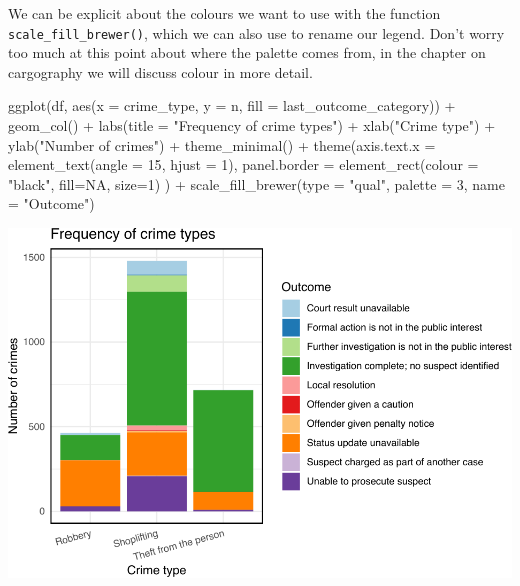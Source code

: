 \documentclass[
  krantz2]{krantz}
\makeatletter
\newenvironment{Shaded}{\begin{snugshade}}{\end{snugshade}}
\newcommand{\AttributeTok}[1]{\textcolor[rgb]{0.61,0.61,0.61}{#1}}
\newcommand{\ConstantTok}[1]{\textcolor[rgb]{0,0,0}{#1}}
\newcommand{\DecValTok}[1]{\textcolor[rgb]{0.06,0.06,0.06}{#1}}
\newcommand{\FunctionTok}[1]{\textcolor[rgb]{0,0,0}{#1}}
\newcommand{\NormalTok}[1]{#1}
\newcommand{\SpecialCharTok}[1]{\textcolor[rgb]{0,0,0}{#1}}
\newcommand{\StringTok}[1]{\textcolor[rgb]{0.5,0.5,0.5}{#1}}
\newenvironment{kframe}{%
\medskip{}
\setlength{\fboxsep}{.8em}
 \def\at@end@of@kframe{}%
 \ifinner\ifhmode%
  \def\at@end@of@kframe{\end{minipage}}%
  \begin{minipage}{\columnwidth}%
 \fi\fi%
 \def\FrameCommand##1{\hskip\@totalleftmargin \hskip-\fboxsep
 \colorbox{shadecolor}{##1}\hskip-\fboxsep
     \hskip-\linewidth \hskip-\@totalleftmargin \hskip\columnwidth}%
 \MakeFramed {\advance\hsize-\width
   \@totalleftmargin\z@ \linewidth\hsize
   \@setminipage}}%
 {\par\unskip\endMakeFramed%
 \at@end@of@kframe}
\renewenvironment{Shaded}{\begin{kframe}}{\end{kframe}}
\makeatother
\begin{document}
We can be explicit about the colours we want to use with the function \texttt{scale\_fill\_brewer()}, which we can also use to rename our legend. Don't worry too much at this point about where the palette comes from, in the chapter on cargography we will discuss colour in more detail.

\begin{Shaded}
\begin{Highlighting}[]
\FunctionTok{ggplot}\NormalTok{(df, }\FunctionTok{aes}\NormalTok{(}\AttributeTok{x =}\NormalTok{ crime\_type, }
               \AttributeTok{y =}\NormalTok{ n, }
               \AttributeTok{fill =}\NormalTok{ last\_outcome\_category)) }\SpecialCharTok{+} 
  \FunctionTok{geom\_col}\NormalTok{() }\SpecialCharTok{+} 
  \FunctionTok{labs}\NormalTok{(}\AttributeTok{title =} \StringTok{"Frequency of crime types"}\NormalTok{) }\SpecialCharTok{+} 
  \FunctionTok{xlab}\NormalTok{(}\StringTok{"Crime type"}\NormalTok{) }\SpecialCharTok{+} 
  \FunctionTok{ylab}\NormalTok{(}\StringTok{"Number of crimes"}\NormalTok{) }\SpecialCharTok{+} 
  \FunctionTok{theme\_minimal}\NormalTok{() }\SpecialCharTok{+} 
  \FunctionTok{theme}\NormalTok{(}\AttributeTok{axis.text.x =} \FunctionTok{element\_text}\NormalTok{(}\AttributeTok{angle =} \DecValTok{15}\NormalTok{, }
                                   \AttributeTok{hjust =} \DecValTok{1}\NormalTok{), }
        \AttributeTok{panel.border =} \FunctionTok{element\_rect}\NormalTok{(}\AttributeTok{colour =} \StringTok{"black"}\NormalTok{, }
                                    \AttributeTok{fill=}\ConstantTok{NA}\NormalTok{, }
                                    \AttributeTok{size=}\DecValTok{1}\NormalTok{)}
\NormalTok{        ) }\SpecialCharTok{+} 
  \FunctionTok{scale\_fill\_brewer}\NormalTok{(}\AttributeTok{type =} \StringTok{"qual"}\NormalTok{, }\AttributeTok{palette =} \DecValTok{3}\NormalTok{, }\AttributeTok{name =} \StringTok{"Outcome"}\NormalTok{)}
\end{Highlighting}
\end{Shaded}

\includegraphics{crime_mapping_files/figure-latex/unnamed-chunk-13-1.pdf}
\end{document}
